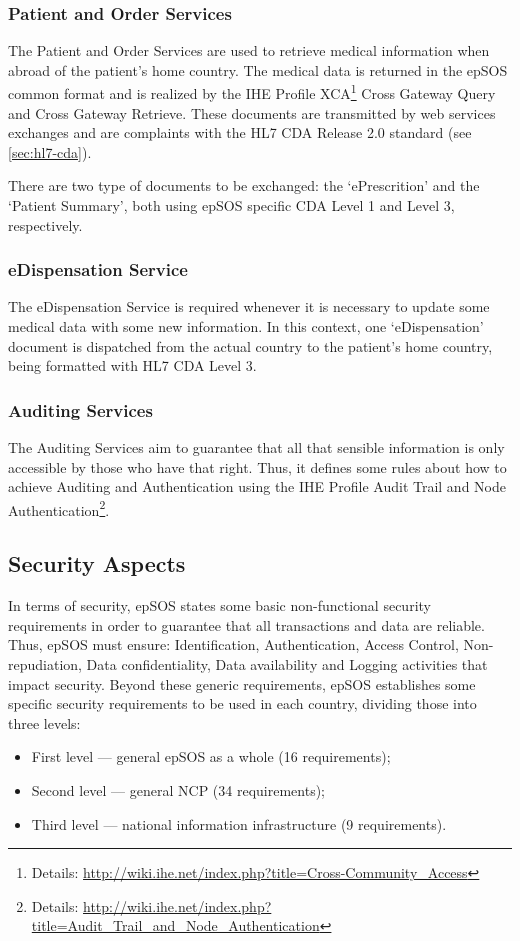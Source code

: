 \subsubsection{Patient and Order Services}
The Patient and Order Services are used to retrieve medical information when abroad of the patient's home country. The medical data is returned in the epSOS common format and is realized by the IHE Profile XCA\footnote{Details: \url{http://wiki.ihe.net/index.php?title=Cross-Community_Access}} Cross Gateway Query and Cross Gateway Retrieve. These documents are transmitted by web services exchanges and are complaints with the HL7 CDA Release 2.0 standard (see \ref{sec:hl7-cda}).

There are two type of documents to be exchanged: the `ePrescrition' and the `Patient Summary', both using epSOS specific CDA Level 1 and Level 3, respectively.

\subsubsection{eDispensation Service}

The eDispensation Service is required whenever it is necessary to update some medical data with some new information. In this context, one `eDispensation' document is dispatched from the actual country to the patient's home country, being formatted with HL7 CDA Level 3.

\subsubsection{Auditing Services}

The Auditing Services aim to guarantee that all that sensible information is only accessible by those who have that right. Thus, it defines some rules about how to achieve Auditing and Authentication using the IHE Profile Audit Trail and Node Authentication\footnote{Details: \url{http://wiki.ihe.net/index.php?title=Audit_Trail_and_Node_Authentication}}. 

\subsection{Security Aspects}
In terms of security, epSOS states some basic non-functional security requirements in order to guarantee that all transactions and data are reliable. Thus, epSOS must ensure: Identification, Authentication, Access Control, Non-repudiation, Data confidentiality, Data availability and Logging activities that impact security. Beyond these generic requirements, epSOS establishes some specific security requirements to be used in each country, dividing those into three levels:
\begin{itemize}
\item First level --- general epSOS as a whole (16 requirements);
\item Second level --- general NCP (34 requirements);
\item Third level --- national information infrastructure (9 requirements).
\end{itemize}

